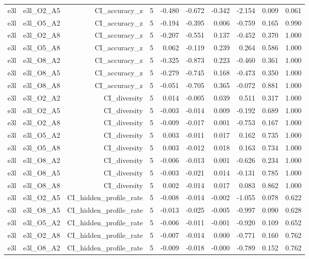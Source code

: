 \documentclass[11pt]{article}
\begin{document}
\begin{landscape}
\begin{longtable}{@{}lrrrrrrrrr@{}}
e3l & e3l\_O2\_A5 & CI\_accuracy\_z & 5 & -0.480 & -0.672 & -0.342 & -2.154 & 0.009 & 0.061 \\
e3l & e3l\_O5\_A2 & CI\_accuracy\_z & 5 & -0.194 & -0.395 & 0.006 & -0.759 & 0.165 & 0.990 \\
e3l & e3l\_O2\_A8 & CI\_accuracy\_z & 5 & -0.207 & -0.551 & 0.137 & -0.452 & 0.370 & 1.000 \\
e3l & e3l\_O5\_A8 & CI\_accuracy\_z & 5 & 0.062 & -0.119 & 0.239 & 0.264 & 0.586 & 1.000 \\
e3l & e3l\_O8\_A2 & CI\_accuracy\_z & 5 & -0.325 & -0.873 & 0.223 & -0.460 & 0.361 & 1.000 \\
e3l & e3l\_O8\_A5 & CI\_accuracy\_z & 5 & -0.279 & -0.745 & 0.168 & -0.473 & 0.350 & 1.000 \\
e3l & e3l\_O8\_A8 & CI\_accuracy\_z & 5 & -0.051 & -0.705 & 0.365 & -0.072 & 0.881 & 1.000 \\
e3l & e3l\_O2\_A2 & CI\_diversity & 5 & 0.014 & -0.005 & 0.039 & 0.511 & 0.317 & 1.000 \\
e3l & e3l\_O2\_A5 & CI\_diversity & 5 & -0.003 & -0.014 & 0.009 & -0.192 & 0.689 & 1.000 \\
e3l & e3l\_O2\_A8 & CI\_diversity & 5 & -0.009 & -0.017 & 0.001 & -0.753 & 0.167 & 1.000 \\
e3l & e3l\_O5\_A2 & CI\_diversity & 5 & 0.003 & -0.011 & 0.017 & 0.162 & 0.735 & 1.000 \\
e3l & e3l\_O5\_A8 & CI\_diversity & 5 & 0.003 & -0.012 & 0.018 & 0.163 & 0.734 & 1.000 \\
e3l & e3l\_O8\_A2 & CI\_diversity & 5 & -0.006 & -0.013 & 0.001 & -0.626 & 0.234 & 1.000 \\
e3l & e3l\_O8\_A5 & CI\_diversity & 5 & -0.003 & -0.021 & 0.014 & -0.131 & 0.785 & 1.000 \\
e3l & e3l\_O8\_A8 & CI\_diversity & 5 & 0.002 & -0.014 & 0.017 & 0.083 & 0.862 & 1.000 \\
e3l & e3l\_O2\_A5 & CI\_hidden\_profile\_rate & 5 & -0.008 & -0.014 & -0.002 & -1.055 & 0.078 & 0.622 \\
e3l & e3l\_O8\_A5 & CI\_hidden\_profile\_rate & 5 & -0.013 & -0.025 & -0.005 & -0.997 & 0.090 & 0.628 \\
e3l & e3l\_O5\_A2 & CI\_hidden\_profile\_rate & 5 & -0.006 & -0.011 & -0.001 & -0.920 & 0.109 & 0.652 \\
e3l & e3l\_O2\_A8 & CI\_hidden\_profile\_rate & 5 & -0.007 & -0.014 & 0.000 & -0.771 & 0.160 & 0.762 \\
e3l & e3l\_O8\_A2 & CI\_hidden\_profile\_rate & 5 & -0.009 & -0.018 & -0.000 & -0.789 & 0.152 & 0.762 \\

\end{longtable}
\end{landscape}
\end{document}
